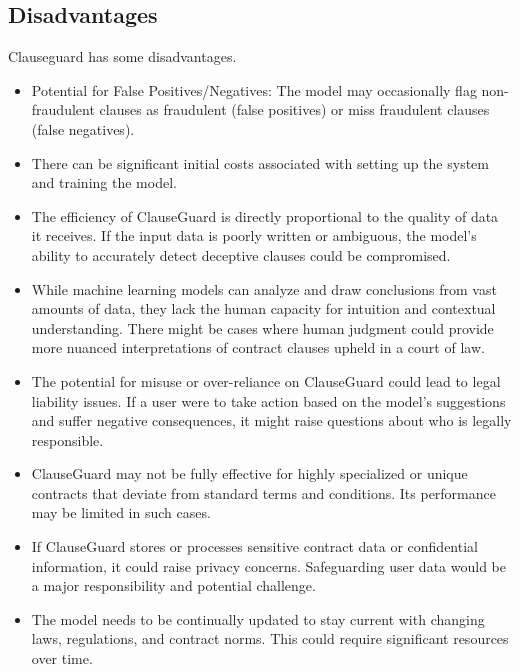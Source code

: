 \begin{itemize}
\begin{itemize}
        \end{itemize}
        \subsection{Disadvantages}
        Clauseguard has some disadvantages. 
        \begin{itemize}
            \item Potential for False Positives/Negatives: The model may occasionally flag non-fraudulent clauses as fraudulent (false positives) or miss fraudulent clauses (false negatives).
            \item There can be significant initial costs associated with setting up the system and training the model.
            \item The efficiency of ClauseGuard is directly proportional to the quality of data it receives. If the input data is poorly written or ambiguous, the model's ability to accurately detect deceptive clauses could be compromised.

            \item  While machine learning models can analyze and draw conclusions from vast amounts of data, they lack the human capacity for intuition and contextual understanding. There might be cases where human judgment could provide more nuanced interpretations of contract clauses upheld in a court of law.
            \item The potential for misuse or over-reliance on ClauseGuard could lead to legal liability issues. If a user were to take action based on the model's suggestions and suffer negative consequences, it might raise questions about who is legally responsible.
            \item ClauseGuard may not be fully effective for highly specialized or unique contracts that deviate from standard terms and conditions. Its performance may be limited in such cases.
            \item If ClauseGuard stores or processes sensitive contract data or confidential information, it could raise privacy concerns. Safeguarding user data would be a major responsibility and potential challenge.
            \item The model needs to be continually updated to stay current with changing laws, regulations, and contract norms. This could require significant resources over time.














\end{itemize}
\end{itemize}
